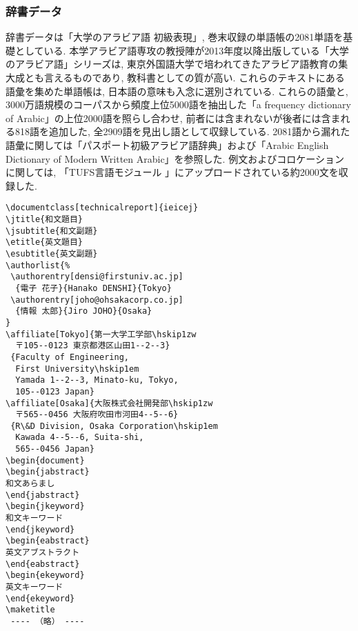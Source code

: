 \documentclass[technicalreport]{ieicej}
\begin{document}
\subsubsection{辞書データ}
辞書データは「大学のアラビア語 初級表現」, 巻末収録の単語帳の2081単語を基礎としている. 本学アラビア語専攻の教授陣が2013年度以降出版している「大学のアラビア語」シリーズは, 東京外国語大学で培われてきたアラビア語教育の集大成とも言えるものであり, 教科書としての質が高い. これらのテキストにある語彙を集めた単語帳は, 日本語の意味も入念に選別されている. これらの語彙と, 3000万語規模のコーパスから頻度上位5000語を抽出した「a frequency dictionary of Arabic」の上位2000語を照らし合わせ, 前者には含まれないが後者には含まれる818語を追加した, 全2909語を見出し語として収録している. 2081語から漏れた語彙に関しては「パスポート初級アラビア語辞典」および「Arabic English Dictionary of Modern Written Arabic」を参照した. 例文およびコロケーションに関しては, 「TUFS言語モジュール 」にアップロードされている約2000文を収録した.
\begin{verbatim}
\documentclass[technicalreport]{ieicej}
\jtitle{和文題目}
\jsubtitle{和文副題}
\etitle{英文題目}
\esubtitle{英文副題}
\authorlist{%
 \authorentry[densi@firstuniv.ac.jp]
  {電子 花子}{Hanako DENSHI}{Tokyo}
 \authorentry[joho@ohsakacorp.co.jp]
  {情報 太郎}{Jiro JOHO}{Osaka}
}
\affiliate[Tokyo]{第一大学工学部\hskip1zw
  〒105--0123 東京都港区山田1--2--3}
 {Faculty of Engineering, 
  First University\hskip1em
  Yamada 1--2--3, Minato-ku, Tokyo,
  105--0123 Japan}
\affiliate[Osaka]{大阪株式会社開発部\hskip1zw
  〒565--0456 大阪府吹田市河田4--5--6}
 {R\&D Division, Osaka Corporation\hskip1em
  Kawada 4--5--6, Suita-shi,
  565--0456 Japan}
\begin{document}
\begin{jabstract}
和文あらまし
\end{jabstract}
\begin{jkeyword}
和文キーワード
\end{jkeyword}
\begin{eabstract}
英文アブストラクト
\end{eabstract}
\begin{ekeyword}
英文キーワード
\end{ekeyword}
\maketitle
 ---- （略） ----
\end{verbatim}
\end{document}
